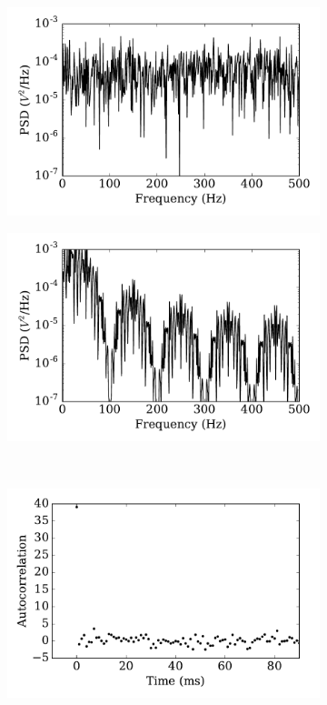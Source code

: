 \begin{figure}[tbp!]
\begin{subfigure}[t]{0.43\textwidth}
			\includegraphics[width=\textwidth]{pics_iconip/psd_dt1.pdf}
			\caption{}
		\end{subfigure}
		\begin{subfigure}[t]{0.43\textwidth}
			\includegraphics[width=\textwidth]{pics_iconip/psd_dt10.pdf}
			\caption{}
		\end{subfigure}\\
		\begin{subfigure}[t]{0.43\textwidth}
			\includegraphics[width=\textwidth]{pics_iconip/autocorr_dt1.pdf}

\end{subfigure}
\end{figure}

